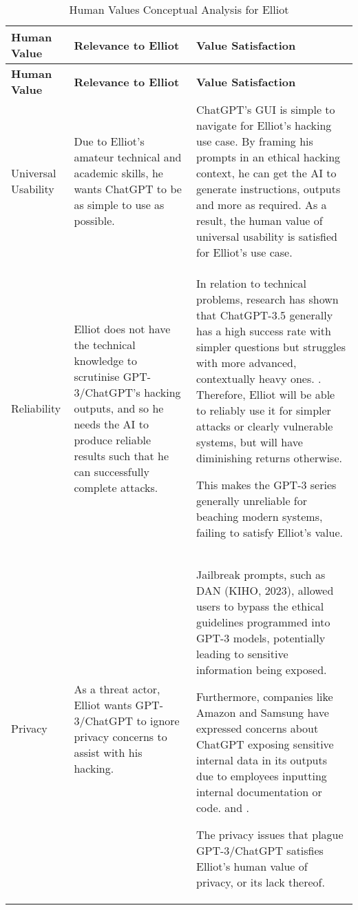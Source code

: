\begin{longtable}{|p{}|p{}|p{}|}
\caption{Human Values Conceptual Analysis for Elliot} \label{tab:Elliot} \\
\hline
\textbf{Human Value} & \textbf{Relevance to Elliot} & \textbf{Value Satisfaction} \\
\hline
\endfirsthead

\hline
\textbf{Human Value} & \textbf{Relevance to Elliot} & \textbf{Value Satisfaction} \\
\hline
\endhead

\hline
\endfoot

\hline
\endlastfoot
Universal Usability & Due to Elliot’s amateur technical and academic skills, he wants ChatGPT to be as simple to use as possible. & ChatGPT’s GUI is simple to navigate for Elliot’s hacking use case. By framing his prompts in an ethical hacking context, he can get the AI to generate instructions, outputs and more as required. As a result, the human value of universal usability is satisfied for Elliot’s use case. \\
\hline
Reliability & Elliot does not have the technical knowledge to scrutinise GPT-3/ChatGPT’s hacking outputs, and so he needs the AI to produce reliable results such that he can successfully complete attacks. & In relation to technical problems, research has shown that ChatGPT-3.5 generally has a high success rate with simpler questions but struggles with more advanced, contextually heavy ones. \parencite{li_2024_efficiency}. Therefore, Elliot will be able to reliably use it for simpler attacks or clearly vulnerable systems, but will have diminishing returns otherwise.

This makes the GPT-3 series generally unreliable for beaching modern systems, failing to satisfy Elliot’s value.
\\
\hline
Privacy & As a threat actor, Elliot wants GPT-3/ChatGPT to ignore privacy concerns to assist with his hacking. & Jailbreak prompts, such as DAN (KIHO, 2023), allowed users to bypass the ethical guidelines programmed into GPT-3 models, potentially leading to sensitive information being exposed.

Furthermore, companies like Amazon and Samsung have expressed concerns about ChatGPT exposing sensitive internal data in its outputs due to employees inputting internal documentation or code. \parencite{kim_2025_amazon} and \parencite{ray_2024_samsung}.

The privacy issues that plague GPT-3/ChatGPT satisfies Elliot’s human value of privacy, or its lack thereof. 
\\
\hline
\end{longtable}

